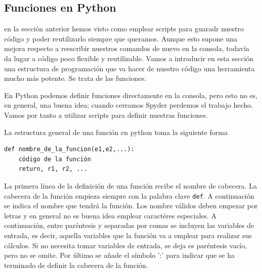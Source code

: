 \begin{paracol}{2}

\section{Funciones en Python} 
en la sección anterior hemos visto como emplear scripts para guaradr nuestro código y poder reutilizarlo siempre que queramos. Aunque esto supone una mejora respecto a reescribir nuestros comandos de nuevo en la consola, todavía da lugar a código poco flexible y reutilizable. Vamos a introducir en esta sección una estructura de programación que va hacer de nuestro código una herramienta mucho más potente. Se trata de las funciones.

En Python podemos definir funciones directamente en la consola, pero esto no es, en general, una buena idea; cuando cerramos Spyder perdemos el trabajo hecho. Vamos por tanto a utilizar scripts para definir nuestras funciones.

La estructura general de una función en python toma la siguiente forma

\begin{verbatim}
def nombre_de_la_funcion(e1,e2,...):
    código de la función
    return, r1, r2, ...
\end{verbatim}

La primera línea de la definición de una función recibe el nombre de cabecera. La cabecera de la función empieza siempre con la palabra clave \texttt{def}. A continuación se indica el nombre que tendrá la función. Los nombre válidos deben empezar por letras y en general no es buena idea emplear caractéres especiales. A continuación, entre paréntesis y separadas por comas se incluyen las variables de entrada, es decir, aquella variables que la función va  a emplear para realizar sus cálculos. Si no necesita tomar variables de entrada, se deja es paréntesis vacío, pero no se omite. Por último se añade el símbolo ':' para indicar que se ha terminado de definir la cabecera de la función.


\end{paracol}
